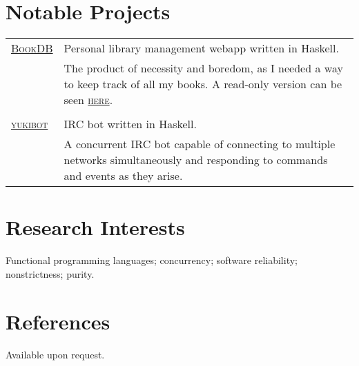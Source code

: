 \documentclass[a4paper,10pt]{article}
\newcommand{\schref}[2]{\href{#1}{\textsc{#2}}}
\newenvironment{cvtable}{\begin{tabular}{x{2cm}|p{11.6cm}}}{\end{tabular}}
\newcommand{\heading}[1]{\textsc{#1} &}
\newcommand{\detail}[1]{ & \footnotesize{#1}}
\begin{document}
\section{Notable Projects}
\begin{cvtable}
  \heading{\schref{https://github.com/barrucadu/bookdb}{BookDB}}
  Personal library management webapp written in Haskell.\\
  \detail{The product of necessity and boredom, as I needed a way to
    keep track of all my books. A read-only version can be seen
    \schref{http://www.barrucadu.co.uk/bookdb/}{here}.}\\\\


  \heading{\schref{https://github.com/barrucadu/yukibot}{yukibot}}
  IRC bot written in Haskell.\\
  \detail{A concurrent IRC bot capable of connecting to multiple
    networks simultaneously and responding to commands and events as
    they arise.}
\end{cvtable}

\section{Research Interests}
Functional programming languages; concurrency; software reliability;
nonstrictness; purity.

\section{References}
Available upon request.
\end{document}
